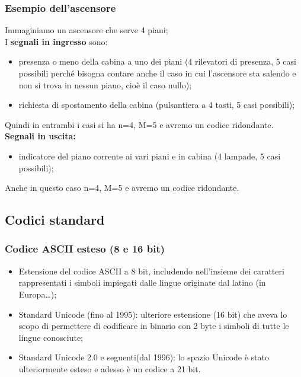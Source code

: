 \documentclass{article}
\begin{document}
\subsubsection{Esempio dell'ascensore}
Immaginiamo un ascensore che serve 4 piani;\\
I \textbf{segnali in ingresso} sono:
\begin{itemize}
    \item presenza o meno della cabina a uno dei piani (4 rilevatori di presenza, 5 casi possibili perché bisogna contare anche il caso in cui l'ascensore sta salendo e non si trova in nessun piano, cioè il caso nullo);
    \item richiesta di spostamento della cabina (pulsantiera a 4 tasti, 5 casi possibili);
\end{itemize}
Quindi in entrambi i casi si ha n=4, M=5 e avremo un codice ridondante.
\vspace{0.2cm}\\
\textbf{Segnali in uscita:}
\begin{itemize}
    \item indicatore del piano corrente ai vari piani e in cabina (4 lampade, 5 casi possibili);
\end{itemize}
Anche in questo caso n=4, M=5 e avremo un codice ridondante.
\subsection{Codici standard}
\subsubsection{Codice ASCII esteso (8 e 16 bit)}
\begin{itemize}
    \item Estensione del codice ASCII a 8 bit, includendo nell’insieme dei caratteri
    rappresentati i simboli impiegati dalle lingue originate dal latino (in Europa…);
\item Standard Unicode (fino al 1995): ulteriore estensione (16 bit) che aveva lo scopo di
permettere di codificare in binario con 2 byte i simboli di tutte le lingue conosciute;
\item Standard Unicode 2.0 e seguenti(dal 1996): lo spazio Unicode è stato ulteriormente
esteso e adesso è un codice a 21 bit.
\end{itemize}
\end{document}
